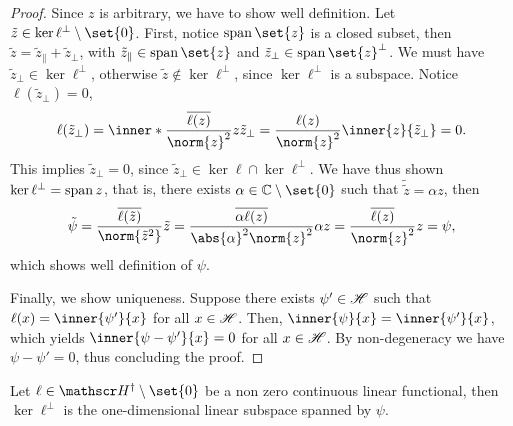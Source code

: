 \begin{proof}
    Since \(z\) is arbitrary, we have to show well definition. Let \(\tilde{z} \in \ker\ell^\perp\setminus\set{0}\). First, notice \(\lspan\set{z}\) is a closed subset, then \(\tilde{z} = \tilde{z}_\parallel + \tilde{z}_\perp\), with \(\tilde{z}_\parallel \in \lspan\set{z}\) and \(\tilde{z}_\perp \in \lspan\set{z}^\perp\). We must have \(\tilde{z}_\perp \in \ker\ell^\perp\), otherwise \(\tilde{z} \notin \ker\ell^\perp\), since \(\ker\ell^\perp\) is a subspace. Notice \(\ell(\tilde{z}_\perp) = 0\),
    \begin{equation*}
        \ell(\tilde{z}_\perp) = \inner*{\frac{\conj{\ell(z)}}{\norm{z}^2}z}{\tilde{z}_\perp} = \frac{\ell(z)}{\norm{z}^2} \inner{z}{\tilde{z}_\perp} = 0.
    \end{equation*}
    This implies \(\tilde{z}_\perp = 0\), since \(\tilde{z}_\perp \in \ker\ell \cap \ker\ell^\perp\). We have thus shown \(\ker\ell^\perp = \operatorname{span}{z}\), that is, there exists \(\alpha \in \mathbb{C}\setminus \set{0}\) such that \(\tilde{\tilde{z}} = \alpha z\), then
    \begin{equation*}
        \tilde{\psi} = \frac{\conj{\ell(\tilde{z})}}{\norm{\tilde{z}^2}}\tilde{z} = \frac{\conj{\alpha \ell(z)}}{\abs{\alpha}^2\norm{z}^2}\alpha z = \frac{\conj{\ell(z)}}{\norm{z}^2}z = \psi,
    \end{equation*}
    which shows well definition of \(\psi\).

    Finally, we show uniqueness. Suppose there exists \(\psi'\in \mathscr{H}\) such that \(\ell(x) = \inner{\psi'}{x}\) for all \(x \in \mathscr{H}\). Then, \(\inner{\psi}{x} = \inner{\psi'}{x}\), which yields \(\inner{\psi - \psi'}{x} = 0\) for all \(x \in \mathscr{H}\). By non-degeneracy we have \(\psi - \psi' = 0\), thus concluding the proof.
\end{proof}
\begin{corollary}
    Let \(\ell \in \hilbert^\dag\setminus\set{0}\) be a non zero continuous linear functional, then \(\ker \ell^\perp\) is the one-dimensional linear subspace spanned by \(\psi\).
\end{corollary}

